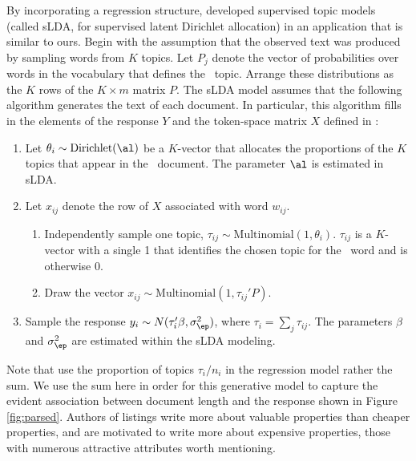 \documentclass[12pt]{article}
\begin{document}
By incorporating a regression structure,  \citet{bleimcauliffe07} developed supervised topic models (called sLDA, for supervised latent Dirichlet allocation) in an application that is similar to ours.  Begin with the assumption that the observed text was produced by sampling words from $K$ topics. Let $P_j$ denote the vector of probabilities over words in the vocabulary that defines the \ith[j]\ topic.  Arrange these distributions as the $K$ rows of the $K \times m$ matrix $P$.  The sLDA model assumes that  the following algorithm generates the text of each document.  In particular, this algorithm fills in the elements of the response $Y$ and the token-space matrix $X$ defined in :
\begin{enumerate}
 \item Let $\theta_i \sim \mbox{Dirichlet}(\al)$ be a $K$-vector that allocates the proportions of
          the $K$ topics that appear in the \ith\ document.  The parameter $\al$ is estimated in sLDA.
 \item Let $x_{ij}$ denote the row of $X$ associated with word $w_{ij}$.
    \begin{enumerate} 
      \item Independently sample one topic, $\tau_{ij} \sim \mbox{Multinomial}(1, \theta_i)$. 
               $\tau_{ij}$ is a $K$-vector with a single 1 that identifies the chosen topic for the \ith[j]\ word and
               is otherwise 0.
       \item Draw the vector $x_{ij} \sim \mbox{Multinomial}(1, \tau_{ij}'P)$.
    \end{enumerate}
  \item Sample the response $y_i \sim N(\tau_i'\beta, \sigma_\ep^2)$, where $\tau_i = \sum_j \tau_{ij}$.  The
           parameters $\beta$ and $\sigma_\ep^2$ are estimated within the sLDA modeling.
\end{enumerate}
Note that \citet{bleimcauliffe07} use the proportion of topics $\tau_i/n_i$ in the regression model rather the sum.  We use the sum here in order for this generative model to capture the evident association between document length and the response shown in Figure \ref{fig:parsed}.  Authors of listings write more about valuable properties than cheaper properties, and are motivated to write more about expensive properties, those with numerous attractive attributes worth mentioning.  
\end{document}
